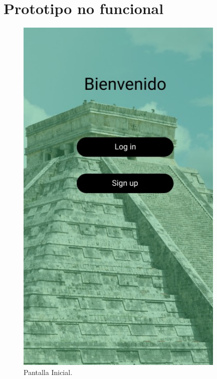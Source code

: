 \section{\textcolor{azul}{Prototipo no funcional}}

\begin{figure}[htb]
    \centering
    \includegraphics[width=10cm]{pantalla1.jpg}
    \caption{Pantalla Inicial.}
    \label{fig:enter-label}
\end{figure}

